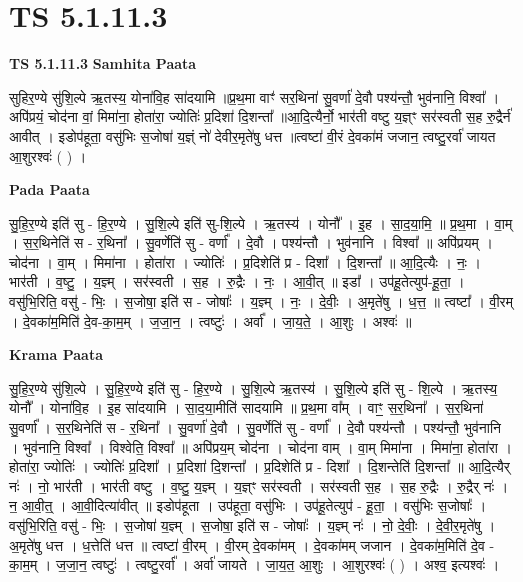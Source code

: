 \documentclass[17pt]{extarticle}
\begin{document}
\section{ TS 5.1.11.3 }

\textbf{TS 5.1.11.3 } \newline
\textbf{Samhita Paata} \newline

सुहिर॒ण्ये सु॑शि॒ल्पे ऋ॒तस्य॒ योना॑वि॒ह सा॑दयामि ॥प्र॒थ॒मा वाꣳ॑ सर॒थिना॑ सु॒वर्णा॑ दे॒वौ पश्य॑न्तौ॒ भुव॑नानि॒ विश्वा᳚ । अपि॑प्रयं॒ चोद॑ना वां॒ मिमा॑ना॒ होता॑रा॒ ज्योतिः॑ प्र॒दिशा॑ दि॒शन्ता᳚ ॥आ॒दि॒त्यैर्नो॒ भार॑ती वष्टु य॒ज्ञ्ꣳ सर॑स्वती स॒ह रु॒द्रैर्न॑ आवीत् । इडोप॑हूता॒ वसु॑भिः स॒जोषा॑ य॒ज्ञ्ं नो॑ देवीर॒मृते॑षु धत्त ॥त्वष्टा॑ वी॒रं दे॒वका॑मं जजान॒ त्वष्टु॒रर्वा॑ जायत आ॒शुरश्वः॑ ( ) । \newline

\textbf{Pada Paata} \newline

सु॒हि॒र॒ण्ये इति॑ सु - हि॒र॒ण्ये । सु॒शि॒ल्पे इति॑ सु-शि॒ल्पे । ऋ॒तस्य॑ । योनौ᳚ । इ॒ह । सा॒द॒या॒मि॒ ॥ प्र॒थ॒मा । वा॒म् । स॒र॒थिनेति॑ स - र॒थिना᳚ । सु॒वर्णेति॑ सु - वर्णा᳚ । दे॒वौ । पश्य॑न्तौ । भुव॑नानि । विश्वा᳚ ॥ अपि॑प्रयम् । चोद॑ना । वा॒म् । मिमा॑ना । होता॑रा । ज्योतिः॑ । प्र॒दिशेति॑ प्र - दिशा᳚ । दि॒शन्ता᳚ ॥ आ॒दि॒त्यैः । नः॒ । भार॑ती । व॒ष्टु॒ । य॒ज्ञ्म् । सर॑स्वती । स॒ह । रु॒द्रैः । नः॒ । आ॒वी॒त् ॥ इडा᳚ । उप॑हू॒तेत्युप॑-हू॒ता॒ । वसु॑भि॒रिति॒ वसु॑ - भिः॒ । स॒जोषा॒ इति॑ स - जोषाः᳚ । य॒ज्ञ्म् । नः॒ । दे॒वीः॒ । अ॒मृते॑षु । ध॒त्त॒ ॥ त्वष्टा᳚ । वी॒रम् । दे॒वका॑म॒मिति॑ दे॒व-का॒म॒म् । ज॒जा॒न॒ । त्वष्टुः॑ । अर्वा᳚ । जा॒य॒ते॒ । आ॒शुः । अश्वः॑ ॥  \newline


\textbf{Krama Paata} \newline

सु॒हि॒र॒ण्ये सु॑शि॒ल्पे । सु॒हि॒र॒ण्ये इति॑ सु - हि॒र॒ण्ये । सु॒शि॒ल्पे ऋ॒तस्य॑ । सु॒शि॒ल्पे इति॑ सु - शि॒ल्पे । ऋ॒तस्य॒ योनौ᳚ । योना॑वि॒ह । इ॒ह सा॑दयामि । सा॒द॒या॒मीति॑ सादयामि ॥ प्र॒थ॒मा वा᳚म् । वाꣳ॒॒ स॒र॒थिना᳚ । स॒र॒थिना॑ सु॒वर्णा᳚ । स॒र॒थिनेति॑ स - र॒थिना᳚ । सु॒वर्णा॑ दे॒वौ । सु॒वर्णेति॑ सु - वर्णा᳚ । दे॒वौ पश्य॑न्तौ । पश्य॑न्तौ॒ भुव॑नानि । भुव॑नानि॒ विश्वा᳚ । विश्वेति॒ विश्वा᳚ ॥ अपि॑प्रय॒म् चोद॑ना । चोद॑ना वाम् । वा॒म् मिमा॑ना । मिमा॑ना॒ होता॑रा । होता॑रा॒ ज्योतिः॑ । ज्योतिः॑ प्र॒दिशा᳚ । प्र॒दिशा॑ दि॒शन्ता᳚ । प्र॒दिशेति॑ प्र - दिशा᳚ । दि॒शन्तेति॑ दि॒शन्ता᳚ ॥ आ॒दि॒त्यैर् नः॑ । नो॒ भार॑ती । भार॑ती वष्टु । व॒ष्टु॒ य॒ज्ञ्म् । य॒ज्ञ्ꣳ सर॑स्वती । सर॑स्वती स॒ह । स॒ह रु॒द्रैः । रु॒द्रैर् नः॑ । न॒ आ॒वी॒त्॒ । आ॒वी॒दित्या॑वीत् ॥ इडोप॑हूता । उप॑हूता॒ वसु॑भिः । उप॑हू॒तेत्युप॑ - हू॒ता॒ । वसु॑भिः स॒जोषाः᳚ । वसु॑भि॒रिति॒ वसु॑ - भिः॒ । स॒जोषा॑ य॒ज्ञ्म् । स॒जोषा॒ इति॑ स - जोषाः᳚ । य॒ज्ञ्म् नः॑ । नो॒ दे॒वीः॒ । दे॒वी॒र॒मृते॑षु । अ॒मृते॑षु धत्त । ध॒त्तेति॑ धत्त ॥ त्वष्टा॑ वी॒रम् । वी॒रम् दे॒वका॑मम् । दे॒वका॑मम् जजान । दे॒वका॑म॒मिति॑ दे॒व - का॒म॒म् । ज॒जा॒न॒ त्वष्टुः॑ । 
त्वष्टु॒रर्वा᳚ । अर्वा॑ जायते । जा॒य॒त॒ आ॒शुः । आ॒शुरश्वः॑ ( ) । 
अश्व॒ इत्यश्वः॑ । \newline
\end{document}
